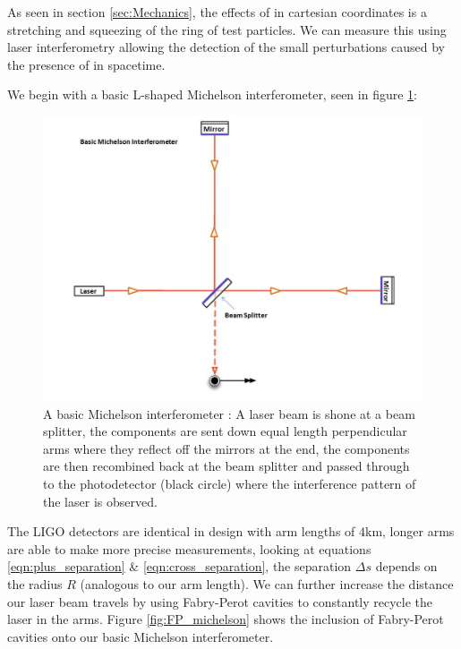 As seen in section \ref{sec:Mechanics}, the effects of \gws in cartesian coordinates is a stretching and squeezing of the ring of test particles. We can measure this using laser interferometry allowing the detection of the small
perturbations caused by the presence of \gws in spacetime.

We begin with a basic L-shaped Michelson interferometer, seen in figure \ref{fig:basic_michelson}:

\begin{figure}
   \includegraphics[width=\textwidth]{images/1_general_relativity/Basic_michelson_labeled.jpg}
   \caption{\label{fig:basic_michelson}A basic Michelson interferometer \cite{ligo_ifo}: A laser beam is shone at a beam splitter, the components are sent down equal length perpendicular arms where they reflect off the mirrors at the end, the components are then recombined back at the beam splitter and passed through to the photodetector (black circle) where the interference pattern of the laser is observed.}
\end{figure}

The LIGO detectors are identical in design with arm lengths of 4km, longer arms are able to make more precise measurements, looking at equations \ref{eqn:plus_separation} \& \ref{eqn:cross_separation}, the separation
$\Delta s$ depends on the radius $R$ (analogous to our arm length). We can further increase the distance our laser beam travels by using Fabry-Perot cavities to constantly recycle the laser in the arms. Figure \ref{fig:FP_michelson} shows the inclusion of Fabry-Perot cavities onto our basic Michelson interferometer.

